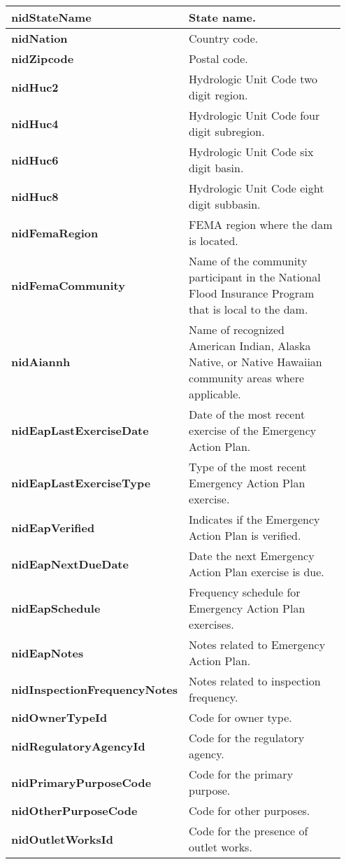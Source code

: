 \documentclass{article}
\begin{document}
\begin{longtable}{p{0.35\linewidth} p{0.6\linewidth}}
\textbf{nidStateName} & State name. \\\hline
\textbf{nidNation} & Country code. \\\hline
\textbf{nidZipcode} & Postal code. \\\hline
\textbf{nidHuc2} & Hydrologic Unit Code two digit region. \\\hline
\textbf{nidHuc4} & Hydrologic Unit Code four digit subregion. \\\hline
\textbf{nidHuc6} & Hydrologic Unit Code six digit basin. \\\hline
\textbf{nidHuc8} & Hydrologic Unit Code eight digit subbasin. \\\hline
\textbf{nidFemaRegion} & FEMA region where the dam is located. \\\hline
\textbf{nidFemaCommunity} & Name of the community participant in the National Flood Insurance Program that is local to the dam. \\\hline
\textbf{nidAiannh} & Name of recognized American Indian, Alaska Native, or Native Hawaiian community areas where applicable. \\\hline
\textbf{nidEapLastExerciseDate} & Date of the most recent exercise of the Emergency Action Plan. \\\hline
\textbf{nidEapLastExerciseType} & Type of the most recent Emergency Action Plan exercise. \\\hline
\textbf{nidEapVerified} & Indicates if the Emergency Action Plan is verified. \\\hline
\textbf{nidEapNextDueDate} & Date the next Emergency Action Plan exercise is due. \\\hline
\textbf{nidEapSchedule} & Frequency schedule for Emergency Action Plan exercises. \\\hline
\textbf{nidEapNotes} & Notes related to Emergency Action Plan. \\\hline
\textbf{nidInspectionFrequencyNotes} & Notes related to inspection frequency. \\\hline
\textbf{nidOwnerTypeId} & Code for owner type. \\\hline
\textbf{nidRegulatoryAgencyId} & Code for the regulatory agency. \\\hline
\textbf{nidPrimaryPurposeCode} & Code for the primary purpose. \\\hline
\textbf{nidOtherPurposeCode} & Code for other purposes. \\\hline
\textbf{nidOutletWorksId} & Code for the presence of outlet works. \\\hline

\end{longtable}
\end{document}
